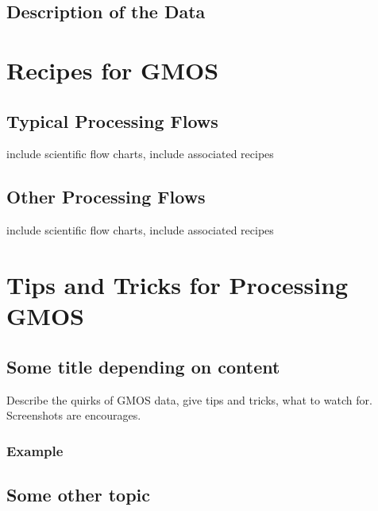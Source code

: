 \documentclass[letterpaper,10pt,english]{sphinxmanual}
\begin{document}
\subsection{Description of the Data}
\label{NIRI/instrument:description-of-the-data}

\section{Recipes for GMOS}
\label{NIRI/recipes:gmos-recipes-and-flows}\label{NIRI/recipes::doc}\label{NIRI/recipes:recipes-for-gmos}

\subsection{Typical Processing Flows}
\label{NIRI/recipes:typical-processing-flows}
include scientific flow charts, include associated recipes


\subsection{Other Processing Flows}
\label{NIRI/recipes:other-processing-flows}
include scientific flow charts, include associated recipes


\section{Tips and Tricks for Processing GMOS}
\label{NIRI/tipstricks:tips-and-tricks-for-processing-gmos}\label{NIRI/tipstricks:gmos-tips-tricks}\label{NIRI/tipstricks::doc}

\subsection{Some title depending on content}
\label{NIRI/tipstricks:some-title-depending-on-content}
Describe the quirks of GMOS data, give tips
and tricks, what to watch for.  Screenshots are encourages.


\subsubsection{Example}
\label{NIRI/tipstricks:example}

\subsection{Some other topic}
\label{NIRI/tipstricks:some-other-topic}
\end{document}
